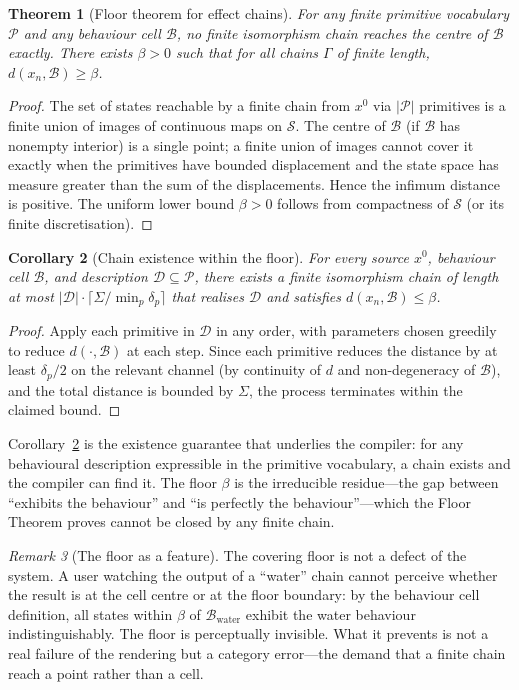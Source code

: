 \documentclass[twocolumn,11pt,a4paper]{article}
\theoremstyle{mee}
\newtheorem{theorem}{Theorem}[section]
\newtheorem{corollary}[theorem]{Corollary}
\theoremstyle{definition}
\theoremstyle{remark}
\newtheorem{remark}[theorem]{Remark}
\newcommand{\State}{\mathcal{S}}
\newcommand{\BState}{\mathcal{B}}
\newcommand{\floor}{\beta}
\newcommand{\Chain}{\Gamma}
\newcommand{\src}{x^{0}}
\newcommand{\Desc}{\mathcal{D}}
\newcommand{\Phys}{\mathcal{P}}
\newcommand{\dist}{d}
\newcommand{\Sig}{\Sigma}
\begin{document}
\begin{theorem}[Floor theorem for effect chains]
\label{thm:floor}
For any finite primitive vocabulary $\Phys$ and any behaviour cell
$\BState$, no finite isomorphism chain reaches the centre of $\BState$
exactly. There exists $\floor>0$ such that for all chains $\Chain$ of
finite length, $\dist(x_n, \BState)\ge\floor$.
\end{theorem}

\begin{proof}
The set of states reachable by a finite chain from $\src$ via $|\Phys|$
primitives is a finite union of images of continuous maps on $\State$.
The centre of $\BState$ (if $\BState$ has nonempty interior) is a single
point; a finite union of images cannot cover it exactly when the
primitives have bounded displacement and the state space has measure
greater than the sum of the displacements. Hence the infimum distance is
positive. The uniform lower bound $\floor>0$ follows from compactness of
$\State$ (or its finite discretisation).
\end{proof}

\begin{corollary}[Chain existence within the floor]
\label{cor:existence}
For every source $\src$, behaviour cell $\BState$, and description
$\Desc\subseteq\Phys$, there exists a finite isomorphism chain of length
at most $|\Desc|\cdot\lceil\Sig/\min_p\delta_p\rceil$ that realises
$\Desc$ and satisfies $\dist(x_n,\BState)\le\floor$.
\end{corollary}

\begin{proof}
Apply each primitive in $\Desc$ in any order, with parameters chosen
greedily to reduce $\dist(\cdot,\BState)$ at each step. Since each
primitive reduces the distance by at least $\delta_p/2$ on the relevant
channel (by continuity of $\dist$ and non-degeneracy of $\BState$), and
the total distance is bounded by $\Sig$, the process terminates within the
claimed bound.
\end{proof}

Corollary~\ref{cor:existence} is the existence guarantee that underlies
the compiler: for any behavioural description expressible in the primitive
vocabulary, a chain exists and the compiler can find it. The floor
$\floor$ is the irreducible residue---the gap between ``exhibits the
behaviour'' and ``is perfectly the behaviour''---which the Floor Theorem
proves cannot be closed by any finite chain.

\begin{remark}[The floor as a feature]
\label{rem:floor-feature}
The covering floor is not a defect of the system. A user watching the
output of a ``water'' chain cannot perceive whether the result is at the
cell centre or at the floor boundary: by the behaviour cell definition,
all states within $\floor$ of $\BState_{\text{water}}$ exhibit the water
behaviour indistinguishably. The floor is perceptually invisible. What it
prevents is not a real failure of the rendering but a category error---the
demand that a finite chain reach a point rather than a cell.
\end{remark}
\end{document}
